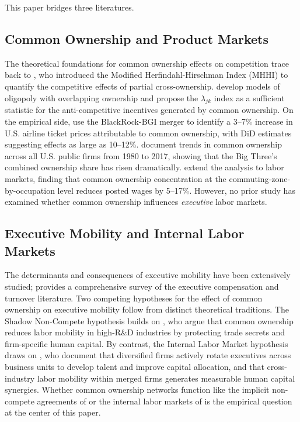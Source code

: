 \documentclass[11pt,a4paper]{article}
\begin{document}
This paper bridges three literatures.

\subsection{Common Ownership and Product Markets}

The theoretical foundations for common ownership effects on competition trace back to \cite{bresnahan1986}, who introduced the Modified Herfindahl-Hirschman Index (MHHI) to quantify the competitive effects of partial cross-ownership. \cite{azar2012,azar2017} develop models of oligopoly with overlapping ownership and propose the $\lambda_{jk}$ index as a sufficient statistic for the anti-competitive incentives generated by common ownership. On the empirical side, \cite{azar2018} use the BlackRock-BGI merger to identify a 3--7\% increase in U.S. airline ticket prices attributable to common ownership, with DiD estimates suggesting effects as large as 10--12\%. \cite{backus2021} document trends in common ownership across all U.S. public firms from 1980 to 2017, showing that the Big Three's combined ownership share has risen dramatically. \cite{azar2018b} extend the analysis to labor markets, finding that common ownership concentration at the commuting-zone-by-occupation level reduces posted wages by 5--17\%. However, no prior study has examined whether common ownership influences \textit{executive} labor markets.

\subsection{Executive Mobility and Internal Labor Markets}

The determinants and consequences of executive mobility have been extensively studied; \cite{murphy1999} provides a comprehensive survey of the executive compensation and turnover literature. Two competing hypotheses for the effect of common ownership on executive mobility follow from distinct theoretical traditions. The Shadow Non-Compete hypothesis builds on \cite{anton2018}, who argue that common ownership reduces labor mobility in high-R\&D industries by protecting trade secrets and firm-specific human capital. By contrast, the Internal Labor Market hypothesis draws on \cite{tate2015,tate2024}, who document that diversified firms actively rotate executives across business units to develop talent and improve capital allocation, and that cross-industry labor mobility within merged firms generates measurable human capital synergies. Whether common ownership networks function like the implicit non-compete agreements of \cite{anton2018} or the internal labor markets of \cite{tate2024} is the empirical question at the center of this paper.
\end{document}
